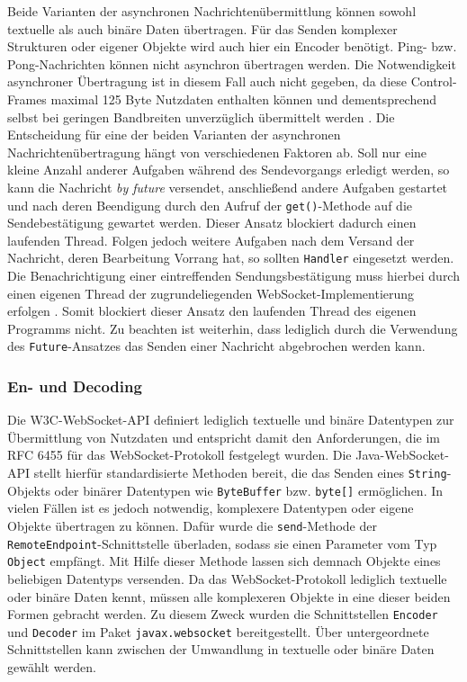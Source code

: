 \documentclass[11pt,a4paper,titlepage]{scrartcl}
\numberwithin{equation}{section}
\begin{document}
\noindent Beide Varianten der asynchronen Nachrichtenübermittlung können sowohl textuelle als auch binäre Daten übertragen. Für das Senden komplexer Strukturen oder eigener Objekte wird auch hier ein Encoder benötigt. Ping- bzw. Pong-Nachrichten können nicht asynchron übertragen werden. Die Notwendigkeit asynchroner Übertragung ist in diesem Fall auch nicht gegeben, da diese Control-Frames maximal 125 Byte Nutzdaten enthalten können und dementsprechend selbst bei geringen Bandbreiten unverzüglich übermittelt werden \autocite[120]{coward_java_2014}. Die Entscheidung für eine der beiden Varianten der asynchronen Nachrichtenübertragung hängt von verschiedenen Faktoren ab. Soll nur eine kleine Anzahl anderer Aufgaben während des Sendevorgangs erledigt werden, so kann die Nachricht \textit{by future} versendet, anschließend andere Aufgaben gestartet und nach deren Beendigung durch den Aufruf der \texttt{get()}-Methode auf die Sendebestätigung gewartet werden. Dieser Ansatz blockiert dadurch einen laufenden Thread. Folgen jedoch weitere Aufgaben nach dem Versand der Nachricht, deren Bearbeitung Vorrang hat, so sollten \texttt{Handler} eingesetzt werden. Die Benachrichtigung einer eintreffenden Sendungsbestätigung muss hierbei durch einen eigenen Thread der zugrundeliegenden WebSocket-Implementierung erfolgen \autocite[123]{coward_java_2014}. Somit blockiert dieser Ansatz den laufenden Thread des eigenen Programms nicht. Zu beachten ist weiterhin, dass lediglich durch die Verwendung des \texttt{Future}-Ansatzes das Senden einer Nachricht abgebrochen werden kann.

\subsubsection{En- und Decoding}\label{subsubsec:DeEnCoding}
Die W3C-WebSocket-API definiert lediglich textuelle und binäre Datentypen zur Übermittlung von Nutzdaten und entspricht damit den Anforderungen, die im RFC 6455 für das WebSocket-Protokoll festgelegt wurden. Die Java-WebSocket-API stellt hierfür standardisierte Methoden bereit, die das Senden eines \texttt{String}-Objekts oder binärer Datentypen wie \texttt{ByteBuffer} bzw. \texttt{byte[]} ermöglichen. In vielen Fällen ist es jedoch notwendig, komplexere Datentypen oder eigene Objekte übertragen zu können. Dafür wurde die \texttt{send}-Methode der \texttt{RemoteEndpoint}-Schnittstelle überladen, sodass sie einen Parameter vom Typ \texttt{Object} empfängt. Mit Hilfe dieser Methode lassen sich demnach Objekte eines beliebigen Datentyps versenden. Da das WebSocket-Protokoll lediglich textuelle oder binäre Daten kennt, müssen alle komplexeren Objekte in eine dieser beiden Formen gebracht werden. Zu diesem Zweck wurden die Schnittstellen \texttt{Encoder} und \texttt{Decoder} im Paket \texttt{javax.websocket} bereitgestellt. Über untergeordnete Schnittstellen kann zwischen der Umwandlung in textuelle oder binäre Daten gewählt werden. \medskip
\end{document}
